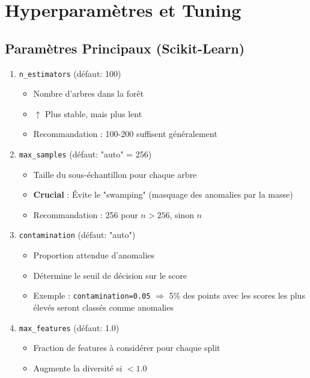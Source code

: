 \documentclass[a4paper,11pt]{article}
\begin{document}
\section{Hyperparamètres et Tuning}

\subsection{Paramètres Principaux (Scikit-Learn)}

\begin{enumerate}
    \item \texttt{n\_estimators} (défaut: 100)
    \begin{itemize}
        \item Nombre d'arbres dans la forêt
        \item $\uparrow$ Plus stable, mais plus lent
        \item Recommandation : 100-200 suffisent généralement
    \end{itemize}
    
    \item \texttt{max\_samples} (défaut: "auto" = 256)
    \begin{itemize}
        \item Taille du sous-échantillon pour chaque arbre
        \item \textbf{Crucial} : Évite le "swamping" (masquage des anomalies par la masse)
        \item Recommandation : 256 pour $n > 256$, sinon $n$
    \end{itemize}
    
    \item \texttt{contamination} (défaut: "auto")
    \begin{itemize}
        \item Proportion attendue d'anomalies
        \item Détermine le seuil de décision sur le score
        \item Exemple : \texttt{contamination=0.05} $\Rightarrow$ 5\% des points avec les scores les plus élevés seront classés comme anomalies
    \end{itemize}
    
    \item \texttt{max\_features} (défaut: 1.0)
    \begin{itemize}
        \item Fraction de features à considérer pour chaque split
        \item Augmente la diversité si $< 1.0$
    \end{itemize}
\end{enumerate}
\end{document}
